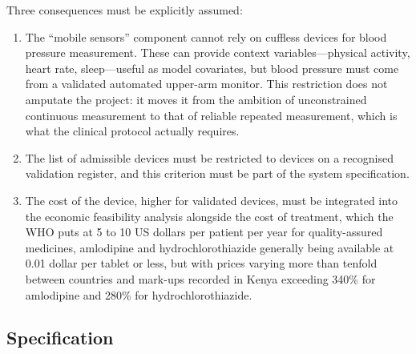 \documentclass[12pt,a4paper,oneside]{report}
\begin{document}
Three consequences must be explicitly assumed:
\begin{enumerate}[nosep]
  \item The ``mobile sensors'' component cannot rely on cuffless devices for blood pressure measurement. These can provide context variables---physical activity, heart rate, sleep---useful as model covariates, but blood pressure must come from a validated automated upper-arm monitor. This restriction does not amputate the project: it moves it from the ambition of unconstrained continuous measurement to that of reliable repeated measurement, which is what the clinical protocol actually requires.
  \item The list of admissible devices must be restricted to devices on a recognised validation register, and this criterion must be part of the system specification.
  \item The cost of the device, higher for validated devices, must be integrated into the economic feasibility analysis alongside the cost of treatment, which the WHO puts at 5 to 10 US dollars per patient per year for quality-assured medicines, amlodipine and hydrochlorothiazide generally being available at 0.01 dollar per tablet or less, but with prices varying more than tenfold between countries and mark-ups recorded in Kenya exceeding 340\% for amlodipine and 280\% for hydrochlorothiazide.
\end{enumerate}

\subsection{Specification}\label{sec:spec13}
\end{document}
